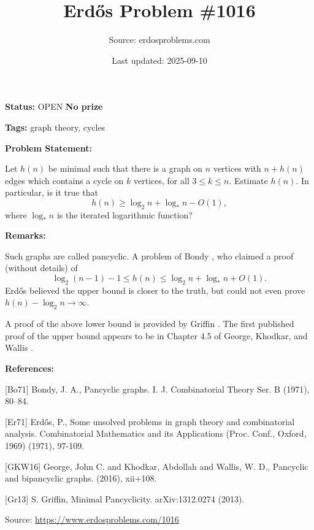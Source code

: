 \documentclass{article}
\title{Erd\H{o}s Problem \#1016}
\date{Last updated: 2025-09-10}
\author{Source: erdosproblems.com}
\begin{document}
\maketitle

\noindent\textbf{Status:} OPEN \quad \textbf{No prize}

\noindent\textbf{Tags:} graph theory, cycles

\medskip
\noindent\textbf{Problem Statement:}

Let $h(n)$ be minimal such that there is a graph on $n$ vertices with $n+h(n)$ edges which contains a cycle on $k$ vertices, for all $3\leq k\leq n$. Estimate $h(n)$. In particular, is it true that\[h(n) \geq \log_2n+\log_*n-O(1),\]where $\log_*n$ is the iterated logarithmic function?

\bigskip
\noindent\textbf{Remarks:}

Such graphs are called pancyclic. A problem of Bondy \cite{Bo71}, who claimed a proof (without details) of\[\log_2(n-1)-1\leq h(n) \leq \log_2n+\log_*n+O(1).\]Erd\H{o}s \cite{Er71} believed the upper bound is closer to the truth, but could not even prove $h(n)-\log_2n\to \infty$.

A proof of the above lower bound is provided by Griffin \cite{Gr13}. The first published proof of the upper bound appears to be in Chapter 4.5 of George, Khodkar, and Wallis \cite{GKW16}.

\bigskip
\noindent\textbf{References:}

[Bo71] Bondy, J. A., Pancyclic graphs. I. J. Combinatorial Theory Ser. B (1971), 80--84.
 
 [Er71] Erd\H{o}s, P., Some unsolved problems in graph theory and combinatorial analysis. Combinatorial Mathematics and its Applications (Proc.
Conf., Oxford, 1969) (1971), 97-109.
 
 [GKW16] George, John C. and Khodkar, Abdollah and Wallis, W. D., Pancyclic and bipancyclic graphs. (2016), xii+108.
 
 [Gr13] S. Griffin, Minimal Pancyclicity. arXiv:1312.0274 (2013).

\bigskip
\noindent\small{Source: \url{https://www.erdosproblems.com/1016}}
\end{document}
